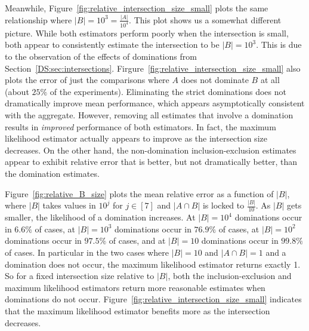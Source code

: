 \documentclass[10]{article}
\begin{document}
Meanwhile, Figure~\ref{fig:relative_intersection_size_small} plots the same relationship where $|B| = 10^3 = \frac{|A|}{10^4}$.
This plot shows us a somewhat different picture. 
While both estimators perform poorly when the intersection is small, both appear to consistently estimate the intersection to be $|B| = 10^3$.
This is due to the observation of the effects of dominations from Section~\ref{DS:sec:intersections}.
Firgure~\ref{fig:relative_intersection_size_small} also plots the error of just the comparisons where $A$ does not dominate $B$ at all (about $25\%$ of the experiments). 
Eliminating the strict dominations does not dramatically improve mean performance, which appears asymptotically consistent with the aggregate.
However, removing all estimates that involve a domination results in \emph{improved} performance of both estimators.
In fact, the maximum likelihood estimator actually appears to improve as the intersection size decreases. 
On the other hand, the non-domination inclusion-exclusion estimates appear to exhibit relative error that is better, but not dramatically better, than the domination estimates.

Figure~\ref{fig:relative_B_size} plots the mean relative error as a function of $|B|$, where $|B|$ takes values in $10^j$ for $j \in [7]$ and $|A \cap B|$ is locked to $\frac{|B|}{10}$.
As $|B|$ gets smaller, the likelihood of a domination increases. 
At $|B|= 10^4$ dominations occur in $6.6\%$ of cases, at $|B|= 10^3$ dominations occur in $76.9\%$ of cases, at $|B|= 10^2$ dominations occur in $97.5\%$ of cases, and at $|B|= 10$ dominations occur in $99.8\%$ of cases.
In particular in the two cases where $|B|=10$ and $|A \cap B| = 1$ and a domination does not occur, the maximum likelihood estimator returns exactly 1. 
So for a fixed intersection size relative to $|B|$, both the inclusion-exclusion and maximum likelihood estimators return more reasonable estimates when dominations do not occur.
Figure~\ref{fig:relative_intersection_size_small} indicates that the maximum likelihood estimator benefits more as the intersection decreases. 
\end{document}
